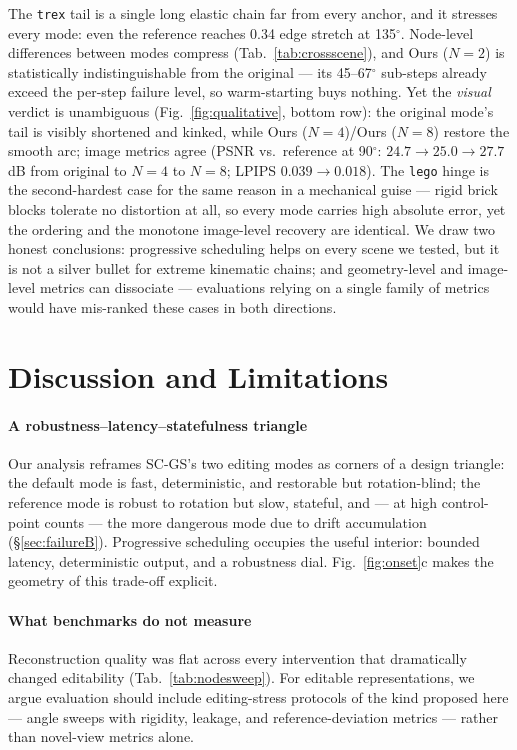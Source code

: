 \documentclass[10pt,twocolumn]{article}
\newcommand{\ours}[1]{Ours ($N{=}#1$)}
\begin{document}
The \texttt{trex} tail is a single long elastic chain far from every anchor,
and it stresses every mode: even the reference reaches 0.34 edge stretch at
135$^\circ$. Node-level differences between modes compress
(Tab.~\ref{tab:crossscene}), and \ours{2} is statistically indistinguishable
from the original --- its 45--67$^\circ$ sub-steps already exceed the per-step
failure level, so warm-starting buys nothing. Yet the \emph{visual} verdict is
unambiguous (Fig.~\ref{fig:qualitative}, bottom row): the original mode's tail
is visibly shortened and kinked, while \ours{4}/\ours{8} restore the smooth
arc; image metrics agree (PSNR vs.\ reference at 90$^\circ$: $24.7
\rightarrow 25.0 \rightarrow 27.7$\,dB from original to $N{=}4$ to $N{=}8$;
LPIPS $0.039 \rightarrow 0.018$). The \texttt{lego} hinge is the
second-hardest case for the same reason in a mechanical guise --- rigid
brick blocks tolerate no distortion at all, so every mode carries high
absolute error, yet the ordering and the monotone image-level recovery are
identical. We draw two honest conclusions: progressive scheduling helps on
every scene we tested, but it is not a silver bullet for extreme kinematic
chains; and geometry-level and image-level metrics can dissociate ---
evaluations relying on a single family of metrics would have mis-ranked these
cases in both directions.

\section{Discussion and Limitations}
\label{sec:discussion}

\paragraph{A robustness--latency--statefulness triangle}
Our analysis reframes SC-GS's two editing modes as corners of a design
triangle: the default mode is fast, deterministic, and restorable but
rotation-blind; the reference mode is robust to rotation but slow, stateful,
and --- at high control-point counts --- the more dangerous mode due to drift
accumulation (\S\ref{sec:failureB}). Progressive scheduling occupies the useful
interior: bounded latency, deterministic output, and a robustness dial.
Fig.~\ref{fig:onset}c makes the geometry of this trade-off explicit.

\paragraph{What benchmarks do not measure}
Reconstruction quality was flat across every intervention that dramatically
changed editability (Tab.~\ref{tab:nodesweep}). For editable representations,
we argue evaluation should include editing-stress protocols of the kind
proposed here --- angle sweeps with rigidity, leakage, and reference-deviation
metrics --- rather than novel-view metrics alone.
\end{document}
